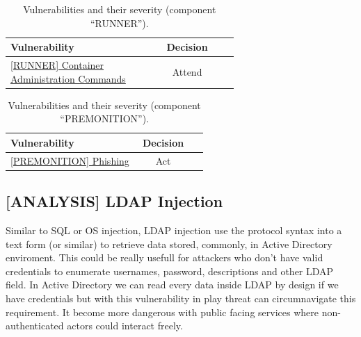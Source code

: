\documentclass[a4paper]{article}
\begin{document}
          \begin{table}[h!]
        \centering
        \caption{Vulnerabilities and their severity (component ``RUNNER'').}
        \begin{tabular}{ p{0.65\linewidth} c d{1} }

          

          \textbf{Vulnerability} & \textbf{Decision} \\
          \hline
                      \hyperref[4:RUNNER:issue.md]{[RUNNER] Container Administration Commands} & Attend \\


                  \end{tabular}
      \end{table}
          \begin{table}[h!]
        \centering
        \caption{Vulnerabilities and their severity (component ``PREMONITION'').}
        \begin{tabular}{ p{0.65\linewidth} c d{1} }

          

          \textbf{Vulnerability} & \textbf{Decision} \\
          \hline
                      \hyperref[5:PREMONITION:issue.md]{[PREMONITION] Phishing} & Act \\


                  \end{tabular}
      \end{table}
    



\clearpage


      \newpage
    
    \subsection{[ANALYSIS] LDAP Injection}
    \label{1:ANALYSIS:issue.md}

    Similar to SQL or OS injection, LDAP injection use the protocol syntax into a text form (or similar) to
retrieve data stored, commonly, in Active Directory enviroment. This could be really usefull for attackers
who don't have valid credentials to enumerate usernames, password, descriptions and other LDAP field. In
Active Directory we can read every data inside LDAP by design if we have credentials but with this vulnerability
in play threat can circumnavigate this requirement. It become more dangerous with public facing services where
non-authenticated actors could interact freely.
\end{document}
